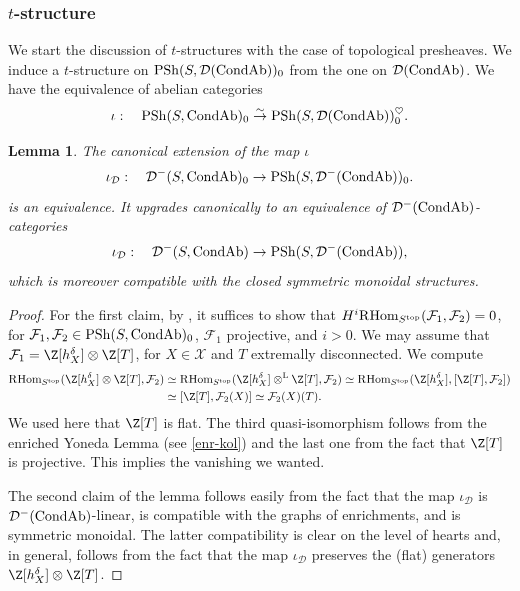 \documentclass[10pt]{amsart}
\newtheorem{lemma}[equation]{Lemma}
\theoremstyle{definition}
\theoremstyle{remark}
\newcommand{\Hom}{{\rm{Hom}} }
\newcommand{\LL}{\operatorname{L} }
\newcommand{\sff}{{\mathcal{F}}}
\newcommand{\sx}{{\mathcal{X}}}
\newcommand{\sd}{{\mathcal{D}}}
\numberwithin{equation}{section}
\def\R{{\mathrm R}}
\numberwithin{equation}{section}
\begin{document}
\subsubsection{$t$-structure} We start the discussion of $t$-structures with the case of topological presheaves. 
We induce a $t$-structure on ${\rm PSh}(S,\sd({\rm CondAb}))_0$ from the one on $\sd({\rm CondAb})$.  We have the equivalence of abelian categories
$$\iota: \quad {\rm PSh}(S,{\rm CondAb})_0\stackrel{\sim}{\to}{{\rm PSh}}(S,\sd({\rm CondAb}))^{\heartsuit}_0.
$$
\begin{lemma}\label{heart1}The canonical extension of the map $\iota$
$$
\iota_{\sd}:\quad \sd^{-}(S,{\rm CondAb})_0\to {{\rm PSh}}(S,\sd^{-}({\rm CondAb}))_0.
$$
is an equivalence. It upgrades canonically to an equivalence of $\sd^{-}({\rm CondAb})$-categories
$$
\iota_{\sd}:\quad {\sd}^{-}(S,{\rm CondAb})\to {{\rm PSh}}(S,\sd^{-}({\rm CondAb})),
$$
 which is moreover compatible with the closed symmetric monoidal structures.
\end{lemma}
\begin{proof}For the first claim, by \cite[Th. 1.3.3.7]{HA}, it suffices to show that $H^i\R\Hom_{S^{\rm top}}(\sff_1,\sff_2)=0$, for  $\sff_1, \sff_2\in  {{\rm PSh}}(S,{\rm CondAb})_0$, $\sff_1$ projective, and $i>0$. We may assume that $\sff_1=\Z[h^{\delta}_{X}]\otimes\Z[T]$, for $X\in \sx$ and $T$ extremally disconnected.  We compute
\begin{align*}
\R\Hom_{S^{\rm top}}(\Z[h^{\delta}_{X}]\otimes\Z[T],\sff_2) & \simeq \R\Hom_{S^{\rm top}}(\Z[h^{\delta}_{X}]\otimes^{\LL}\Z[T],\sff_2)
  \simeq \R\Hom_{S^{\rm top}}(\Z[h^{\delta}_{X}],[\Z[T],\sff_2])\\ & \simeq [\Z[T],\sff_2(X)]\simeq \sff_2(X)(T).
\end{align*}
We used here that $\Z[T]$ is flat. The third quasi-isomorphism follows from the enriched  Yoneda Lemma (see \ref{enr-kol}) and the last one from the fact that $\Z[T]$ is projective. This implies the vanishing we wanted. 

  The second claim of the lemma follows easily from the fact that the map $\iota_{\sd}$ is $\sd^{-}({\rm CondAb})$-linear, is compatible with  the graphs of enrichments,  and is symmetric
  monoidal. The latter compatibility is clear on the level of hearts and, in general, follows from the fact that the map $\iota_{\sd}$ preserves the (flat) generators 
  $\Z[h^{\delta}_X]\otimes\Z[T]$.
\end{proof}
\end{document}
